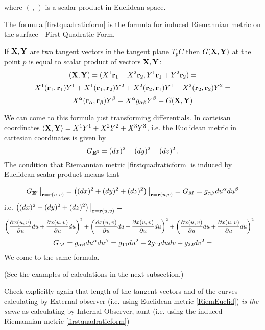 \documentclass[12pt]{article}
\theoremstyle{theorem}
\numberwithin{equation}{section}
\begin{document}
where $(\,,\,)$ is a scalar product in Euclidean space.


The formula \eqref{firstquadraticform} is the formula for induced Riemannian metric on the surface---First Quadratic Form.

  If ${{\bf X},{\bf Y}}$ are two tangent vectors in the tangent plane $T_pC$ then $G({\bf X},{\bf Y})$
  at the point $p$ is equal to scalar product of vectors ${\bf X},{\bf Y}$:
\begin{equation}\label{scalarproduct}
({\bf X},{\bf Y})=(X^1{\bf r}_1+X^2{\bf r}_2, Y^1{\bf r}_1+Y^2{\bf r}_2)=
\end{equation}
                $$
X^1 ({\bf r}_1,{\bf r}_1)Y^1+X^1 ({\bf r}_1,{\bf r}_2)Y^2+X^2 ({\bf r}_2,{\bf r}_1)Y^1+X^2 ({\bf r}_2,{\bf r}_2)Y^2=
$$
$$X^\alpha ({\bf r}_\alpha,{\bf r}_\beta)Y^\beta=
X^\alpha g_{\alpha\beta}Y^\beta=G({\bf X},{\bf Y})
$$





We can come to this formula just transforming differentials.
 In carteisan coordinates $\langle{\bf X},{\bf Y}\rangle=X^1Y^1+X^2Y^2+X^3Y^3$,
i.e. the  Euclidean metric in cartesian coordinates is given by
           \begin{equation}\label{RiemEuclid}
            G_{{\bf E}^3}=(dx)^2+(dy)^2+(dz)^2\,.
           \end{equation}
The condition that Riemannian metric \eqref{firstquadraticform} is induced by Euclidean scalar product means
that

       \begin{equation}\label{intermsofdifferentials1}
        G_{{\bf E}^3}\big\vert_{{\bf r}={\bf r}(u,v)}=\left((dx)^2+(dy)^2+(dz)^2\right)\big\vert_{{\bf r}={\bf r}(u,v)}=
        G_M=g_{\alpha\beta}du^\alpha du^\beta
       \end{equation}
i.e.  $\left((dx)^2+(dy)^2+(dz)^2\right)\big\vert_{{\bf r}={\bf r}(u,v)}=$
          $$
\left({\partial x(u,v)\over \partial u}du+{\partial x(u,v)\over \partial u}du\right)^2+
\left({\partial x(u,v)\over \partial u}du+{\partial x(u,v)\over \partial u}du\right)^2+
\left({\partial x(u,v)\over \partial u}du+{\partial x(u,v)\over \partial u}du\right)^2=
          $$
\begin{equation}\label{firstquadraticform1}
G_M=g_{\alpha\beta}du^\alpha du^\beta=g_{11}du^2+2g_{12}dudv+g_{22}dv^2=
\end{equation}
We come to the same formula.

(See the examples of calculations in the next subsection.)

Check explicitly again that  length of the tangent vectors
and of the curves calculating by External observer (i.e. using Euclidean metric \eqref{RiemEuclid})
{\it is the same} as calculating by Internal Observer, aunt (i.e. using the induced Riemannian metric \eqref{firstquadraticform})
\end{document}
